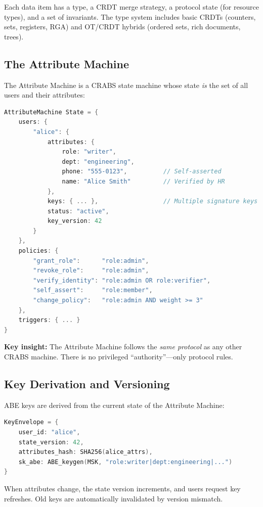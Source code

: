 \documentclass[sigconf,nonacm]{acmart}
\newcommand{\crab}{\textsc{CRABS}}
\begin{document}
Each data item has a type, a CRDT merge strategy, a protocol state (for resource types), and a set of invariants. The type system includes basic CRDTs (counters, sets, registers, RGA) and OT/CRDT hybrids (ordered sets, rich documents, trees).

\subsection{The Attribute Machine}

The Attribute Machine is a \crab{} state machine whose state \textit{is} the set of all users and their attributes:

\begin{lstlisting}[language=C]
AttributeMachine State = {
    users: {
        "alice": {
            attributes: {
                role: "writer",
                dept: "engineering",
                phone: "555-0123",          // Self-asserted
                name: "Alice Smith"         // Verified by HR
            },
            keys: { ... },                  // Multiple signature keys
            status: "active",
            key_version: 42
        }
    },
    policies: {
        "grant_role":      "role:admin",
        "revoke_role":     "role:admin",
        "verify_identity": "role:admin OR role:verifier",
        "self_assert":     "role:member",
        "change_policy":   "role:admin AND weight >= 3"
    },
    triggers: { ... }
}
\end{lstlisting}

\textbf{Key insight:} The Attribute Machine follows the \textit{same protocol} as any other \crab{} machine. There is no privileged ``authority''---only protocol rules.

\subsection{Key Derivation and Versioning}

ABE keys are derived from the current state of the Attribute Machine:

\begin{lstlisting}[language=C]
KeyEnvelope = {
    user_id: "alice",
    state_version: 42,
    attributes_hash: SHA256(alice_attrs),
    sk_abe: ABE_keygen(MSK, "role:writer|dept:engineering|...")
}
\end{lstlisting}

When attributes change, the state version increments, and users request key refreshes. Old keys are automatically invalidated by version mismatch.
\end{document}

